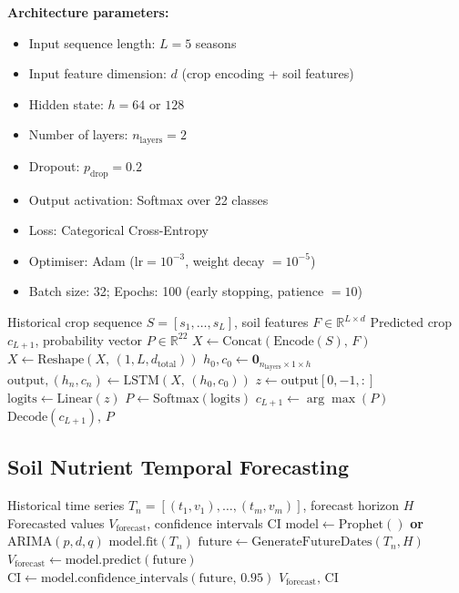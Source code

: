 \documentclass[conference]{IEEEtran}
\begin{document}
\textbf{Architecture parameters:}
\begin{itemize}
  \item Input sequence length: $L = 5$ seasons
  \item Input feature dimension: $d$ (crop encoding + soil features)
  \item Hidden state: $h = 64$ or $128$
  \item Number of layers: $n_{\mathrm{layers}} = 2$
  \item Dropout: $p_{\mathrm{drop}} = 0.2$
  \item Output activation: Softmax over 22 classes
  \item Loss: Categorical Cross-Entropy
  \item Optimiser: Adam ($\mathrm{lr} = 10^{-3}$, weight decay $= 10^{-5}$)
  \item Batch size: 32;\; Epochs: 100 (early stopping, patience $= 10$)
\end{itemize}

\begin{algorithm}[htbp]
\caption{LSTM Crop Sequence Prediction}
\label{alg:lstm}
\begin{algorithmic}[1]
\Require Historical crop sequence $S = [s_1,\ldots,s_L]$,
         soil features $F \in \mathbb{R}^{L \times d}$
\Ensure Predicted crop $c_{L+1}$, probability vector $P \in \mathbb{R}^{22}$
\State $X \gets \mathrm{Concat}(\mathrm{Encode}(S),\, F)$
\State $X \gets \mathrm{Reshape}(X,\, (1, L, d_{\mathrm{total}}))$
\State $h_0, c_0 \gets \mathbf{0}_{n_{\mathrm{layers}} \times 1 \times h}$
\State $\mathrm{output}, (h_n, c_n) \gets \mathrm{LSTM}(X,\, (h_0, c_0))$
\State $z \gets \mathrm{output}[0, -1, :]$ 
\State $\mathrm{logits} \gets \mathrm{Linear}(z)$
\State $P \gets \mathrm{Softmax}(\mathrm{logits})$
\State $c_{L+1} \gets \arg\max(P)$
\State \Return $\mathrm{Decode}(c_{L+1}),\, P$
\end{algorithmic}
\end{algorithm}

\subsection{Soil Nutrient Temporal Forecasting}

\begin{algorithm}[htbp]
\caption{Nutrient Trend Forecasting (Prophet/ARIMA)}
\label{alg:forecast}
\begin{algorithmic}[1]
\Require Historical time series $T_n = [(t_1, v_1), \ldots, (t_m, v_m)]$,
         forecast horizon $H$
\Ensure Forecasted values $V_{\mathrm{forecast}}$, confidence intervals $\mathrm{CI}$
\State $\mathrm{model} \gets \mathrm{Prophet}()$ \textbf{or} $\mathrm{ARIMA}(p, d, q)$
\State $\mathrm{model}.\mathrm{fit}(T_n)$
\State $\mathrm{future} \gets \mathrm{GenerateFutureDates}(T_n, H)$
\State $V_{\mathrm{forecast}} \gets \mathrm{model}.\mathrm{predict}(\mathrm{future})$
\State $\mathrm{CI} \gets \mathrm{model}.\mathrm{confidence\_intervals}(\mathrm{future},\, 0.95)$
\State \Return $V_{\mathrm{forecast}},\, \mathrm{CI}$
\end{algorithmic}
\end{algorithm}
\end{document}
